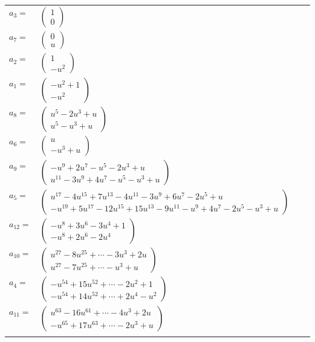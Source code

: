 \documentclass[1p]{elsarticle_modified}
\theoremstyle{definition}
\begin{document}
\begin{tabular}{m{7pt} m{180pt} m{7pt} m{180pt} }
\flushright $a_{3}=$&$\begin{pmatrix}1\\0\end{pmatrix}$ \\
\flushright $a_{7}=$&$\begin{pmatrix}0\\u\end{pmatrix}$ \\
\flushright $a_{2}=$&$\begin{pmatrix}1\\- u^2\end{pmatrix}$ \\
\flushright $a_{1}=$&$\begin{pmatrix}- u^2+1\\- u^2\end{pmatrix}$ \\
\flushright $a_{8}=$&$\begin{pmatrix}u^5-2 u^3+u\\u^5- u^3+u\end{pmatrix}$ \\
\flushright $a_{6}=$&$\begin{pmatrix}u\\- u^3+u\end{pmatrix}$ \\
\flushright $a_{9}=$&$\begin{pmatrix}- u^9+2 u^7- u^5-2 u^3+u\\u^{11}-3 u^9+4 u^7- u^5- u^3+u\end{pmatrix}$ \\
\flushright $a_{5}=$&$\begin{pmatrix}u^{17}-4 u^{15}+7 u^{13}-4 u^{11}-3 u^9+6 u^7-2 u^5+u\\- u^{19}+5 u^{17}-12 u^{15}+15 u^{13}-9 u^{11}- u^9+4 u^7-2 u^5- u^3+u\end{pmatrix}$ \\
\flushright $a_{12}=$&$\begin{pmatrix}- u^8+3 u^6-3 u^4+1\\- u^8+2 u^6-2 u^4\end{pmatrix}$ \\
\flushright $a_{10}=$&$\begin{pmatrix}u^{27}-8 u^{25}+\cdots-3 u^3+2 u\\u^{27}-7 u^{25}+\cdots- u^3+u\end{pmatrix}$ \\
\flushright $a_{4}=$&$\begin{pmatrix}- u^{54}+15 u^{52}+\cdots-2 u^2+1\\- u^{54}+14 u^{52}+\cdots+2 u^4- u^2\end{pmatrix}$ \\
\flushright $a_{11}=$&$\begin{pmatrix}u^{63}-16 u^{61}+\cdots-4 u^3+2 u\\- u^{65}+17 u^{63}+\cdots-2 u^3+u\end{pmatrix}$\\&\end{tabular}
\end{document}
